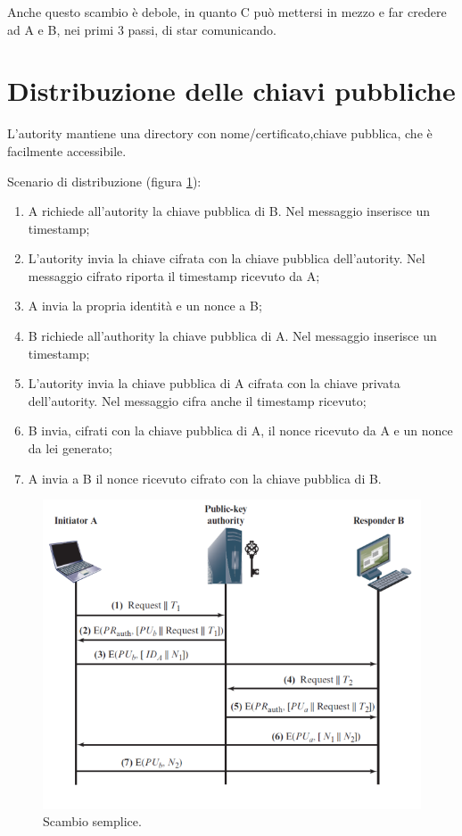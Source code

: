 Anche questo scambio è debole, in quanto C può mettersi in mezzo e far credere ad A e B, nei primi 3 passi, di star comunicando.

\section{Distribuzione delle chiavi pubbliche}

L'autority mantiene una directory con nome/certificato,chiave pubblica, che è facilmente accessibile.

Scenario di distribuzione (figura \ref{fig:3-4}):
\begin{enumerate}
    \item A richiede all'autority la chiave pubblica di B. Nel messaggio inserisce un timestamp;
	\item L'autority invia la chiave cifrata con la chiave pubblica dell'autority. Nel messaggio cifrato riporta il timestamp ricevuto da A;
	\item A invia la propria identità e un nonce a B;
	\item B richiede all'authority la chiave pubblica di A. Nel messaggio inserisce un timestamp;
	\item L'autority invia la chiave pubblica di A cifrata con la chiave privata dell'autority. Nel messaggio cifra anche il timestamp ricevuto;
	\item B invia, cifrati con la chiave pubblica di A, il nonce ricevuto da A e un nonce da lei generato;
	\item A invia a B il nonce ricevuto cifrato con la chiave pubblica di B.
\end{enumerate}

\begin{figure}
    \centering
    \includegraphics[width=1\textwidth]{images/chapter3/3-4.png}
    \caption{Scambio semplice.}
    \label{fig:3-4}
\end{figure}

